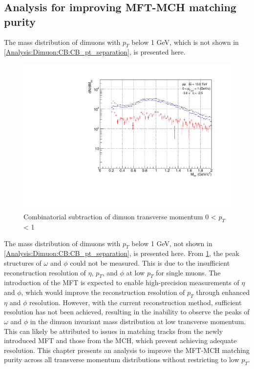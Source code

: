     \subsection{Analysis for improving MFT-MCH matching purity}
    \label{matching improvements}
        The mass distribution of dimuons with \( p_T \) below 1 GeV, which is not shown in \ref{Analysis:Dimuon:CB:CB_pt_separation}, is presented here.
        \begin{figure}
            \centering
            \includegraphics[keepaspectratio, scale=0.4]{fig/3_6_CB_pt0to1.pdf}
            \caption{Combinatorial subtraction of dimuon transverse momentum 0 < $p_T$ < 1}
            \label{Analysis:Dimuon:pt0to1}
        \end{figure}
        The mass distribution of dimuons with \( p_T \) below 1 GeV, not shown in \ref{Analysis:Dimuon:CB:CB_pt_separation}, is presented here.
        From \ref{Analysis:Dimuon:pt0to1}, the peak structures of \(\omega\) and \(\phi\) could not be measured. This is due to the insufficient reconstruction resolution of \(\eta\), \(p_T\), and \(\phi\) at low \(p_T\) for single muons. The introduction of the MFT is expected to enable high-precision measurements of \(\eta\) and \(\phi\), which would improve the reconstruction resolution of \(p_T\) through enhanced \(\eta\) and \(\phi\) resolution. However, with the current reconstruction method, sufficient resolution has not been achieved, resulting in the inability to observe the peaks of \(\omega\) and \(\phi\) in the dimuon invariant mass distribution at low transverse momentum. This can likely be attributed to issues in matching tracks from the newly introduced MFT and those from the MCH, which prevent achieving adequate resolution. This chapter presents an analysis to improve the MFT-MCH matching purity across all transverse momentum distributions without restricting to low \(p_T\).

